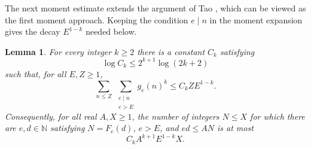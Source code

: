 \documentclass[11pt,letterpaper,reqno]{amsart}
\numberwithin{equation}{section}
\newtheorem{lemma}[theorem]{Lemma}
\theoremstyle{remark}
\newcommand{\N}{\mathbb{N}}
\newcommand{\1}{\mathbf 1}
\renewcommand{\leq}{\leqslant}
\renewcommand{\geq}{\geqslant}
\begin{document}
The next moment estimate extends the argument of Tao \cite{Bloom1054}, which can be viewed as the first moment approach.
Keeping the condition $e\mid n$ in the moment expansion gives the decay $E^{1-k}$ needed below.

\begin{lemma}\label{lem:moment}
For every integer $k\geq2$ there is a constant $C_k$ satisfying
\begin{equation}\label{eq:Ck-growth}
 \log C_k\leq 2^{k+1}\log(2k+2)
\end{equation}
such that, for all $E,Z\geq1$,
\begin{equation}\label{eq:moment}
 \sum_{n\leq Z}\ \sum_{\substack{e\mid n\\e>E}}g_e(n)^k
 \leq C_kZE^{1-k}.
\end{equation}
Consequently, for all real $A,X\geq1$, the number of integers $N\leq X$
for which there are $e,d\in\N$ satisfying $N=F_e(d)$, $e>E$, and
$ed\leq AN$ is at most
\begin{equation}\label{eq:large-count}
 C_kA^{k+1}E^{1-k}X.
\end{equation}
\end{lemma}
\end{document}
